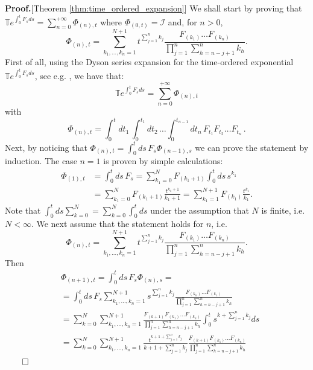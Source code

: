 \documentclass[twocolumn]{autart}    %
\newenvironment{proof}{\textbf{Proof.}}{\hfill $\qed$}
\newcommand{\Ic}{\mathcal{I}}
\newcommand{\Tb}{\mathbb{T}}
\begin{document}
\begin{proof}[Theorem \ref{thm:time_ordered_expansion}]
    We shall start by proving that $\Tb e^{\int_0^t F_s ds} = \sum_{n=0}^{+\infty} \Phi_{(n),t}$ where $\Phi_{(0,t)} = \Ic$ and, for $n>0$, \[\Phi_{(n),t} = \sum_{k_1,\dots,k_n=1}^{N+1} t^{\sum_{j=1}^n k_j} \frac{ F_{(k_1)} \dots F_{(k_n)}}{\prod_{j=1}^n \sum_{h=n-j+1}^n k_h}.\]
    First of all, using the Dyson series expansion for the time-ordered exponential $\Tb e^{\int_0^t F_s ds}$, see e.g. \cite{Dyson,argeri2014magnus,sakurai2020modern}, we have that: 
    \[\Tb e^{\int_0^t F_s ds} = \sum_{n=0}^{+\infty} \Phi_{(n),t}\]  with  
    \[\Phi_{(n),t} = \int_0^t dt_1\, \int_0^{t_1} dt_2\, \dots \int_0^{t_{n-1}} dt_n\, F_{t_1}F_{t_2}\dots F_{t_n}\,    .\]
    Next, by noticing that \(\Phi_{(n),t} = \int_0^t ds\, F_{s} \Phi_{(n-1),s} \) we can prove the statement by induction.
    The case $n=1$ is proven by simple calculations:
    \begin{align*}
        \Phi_{(1),t} &= \int_0^t ds\, F_{s}  = %
        \sum_{k_1=0}^{N} F_{(k_1+1)} \int_0^t ds\, s^{k_1} \\&
        = \sum_{k_1=0}^{N} F_{(k_1+1)} \frac{t^{k_1+1}}{k_1+1}
         = \sum_{k_1=1}^{N+1} F_{(k_1)} \frac{t^{k_1}}{k_1}.
    \end{align*}
    Note that $\int_0^t ds \sum_{k=0}^N = \sum_{k=0}^{N} \int_0^t ds$ under the assumption that $N$ is finite, i.e. $N<\infty$. 
    We next assume that the statement holds for $n$, i.e. 
    \[\Phi_{(n),t} = \sum_{k_1,\dots,k_n=1}^{N+1} t^{\sum_{j=1}^n k_j} \frac{F_{(k_1)}\dots F_{(k_n)}}{\prod_{j=1}^n \sum_{h=n-j+1}^n k_h}.\]
    Then 
    \begin{align*}
        &\Phi_{(n+1),t} = \int_0^t ds\, F_s \Phi_{(n),s} =\\&
        = \int_0^t ds\, F_s \sum_{k_1,\dots,k_n=1}^{N+1} s^{\sum_{j=1}^n k_j} \frac{ F_{(k_n)}\dots F_{(k_1)}}{\prod_{j=1}^n \sum_{h=n-j+1}^n k_h} \\
        &= \sum_{k=0}^{N} \sum_{k_1,\dots,k_n=1}^{N+1}  \frac{ F_{(k+1)} F_{(k_1)}\dots F_{(k_n)}}{\prod_{j=1}^n \sum_{h=n-j+1}^n k_h}  \int_0^t s^{k+\sum_{j=1}^n k_j} ds \\
        &= \sum_{k=0}^{N} \sum_{k_1,\dots,k_n=1}^{N+1} \frac{t^{k+1+\sum_{j=1}^n k_j}}{k+1+\sum_{j=1}^n k_j} \frac{F_{(k+1)} F_{(k_1)}\dots F_{(k_n)}}{\prod_{j=1}^n \sum_{h=n-j+1}^n k_h}

\end{align*}
\end{proof}
\end{document}
